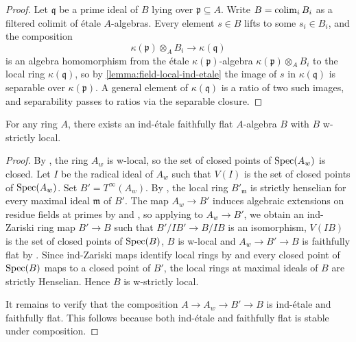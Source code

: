 \begin{proof}
    \leanok
    Let $\mathfrak{q}$ be a prime ideal of $B$ lying over $\mathfrak{p} \subseteq A$.
    Write $B = \operatorname{colim}_i B_i$ as a filtered colimit of étale $A$-algebras. Every element
    $s \in B$ lifts to some $s_i \in B_i$, and the composition
    \[
        \kappa(\mathfrak{p}) \otimes_A B_i \to \kappa(\mathfrak{q})
    \]
    is an algebra homomorphism from the étale $\kappa(\mathfrak{p})$-algebra
    $\kappa(\mathfrak{p}) \otimes_A B_i$ to the local ring $\kappa(\mathfrak{q})$, so by
    \ref{lemma:field-local-ind-etale} the image of $s$ in $\kappa(\mathfrak{q})$ is separable
    over $\kappa(\mathfrak{p})$. A general element of $\kappa(\mathfrak{q})$ is a ratio of two
    such images, and separability passes to ratios via the separable closure.
\end{proof}

\begin{proposition}
    For any ring \(A\), there exists an ind-étale faithfully flat \(A\)-algebra \(B\) with \(B\) w-strictly local.
    \label{thm:ind-etale-w-strictly-local-cover}
\end{proposition}

\begin{proof}
    By , the ring $A_w$ is w-local, so the set of closed points
    of $\mathrm{Spec}(A_w)$ is closed.
    Let $I$ be the radical ideal of $A_w$ such that $V(I)$ is the set of closed points of $\mathrm{Spec}(A_w)$.
    Set $B' = T^{\infty}(A_w)$.
    By , the local ring $B'_{\mathfrak{m}}$ is
    strictly henselian for every maximal ideal $\mathfrak{m}$ of $B'$.
    The map $A_w \to B'$ induces algebraic extensions on residue fields at primes by
     and ,
    so applying  to $A_w \to B'$, we obtain
    an ind-Zariski ring map $B' \to B$ such that $B'/IB' \to B/IB$ is an isomorphism,
    $V(IB)$ is the set of closed points of $\mathrm{Spec}(B)$, $B$ is w-local
    and $A_w \to B' \to B$ is faithfully flat by . Since ind-Zariski maps identify
    local rings by  and every closed point of
    $\mathrm{Spec}(B)$ maps to a closed point of $B'$,
    the local rings at maximal ideals of $B$ are strictly Henselian. Hence $B$ is w-strictly local.

    It remains to verify that the composition $A \to A_w \to B' \to B$ is ind-étale and faithfully flat.
    This follows because both ind-étale and faithfully flat is stable under composition.
\end{proof}

